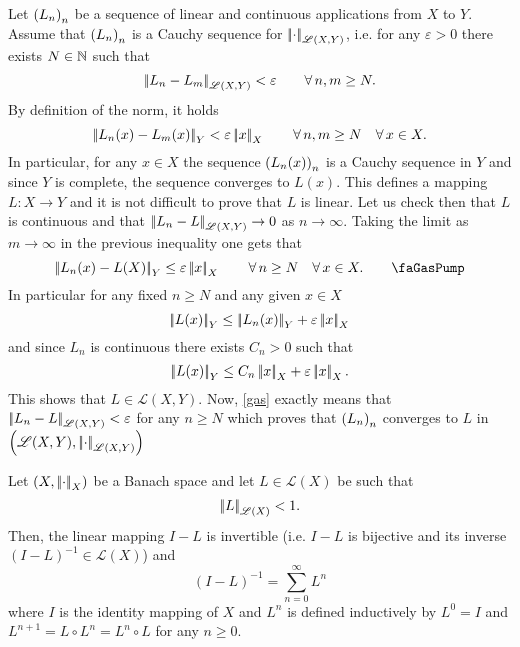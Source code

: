 \documentclass{article}
\begin{document}
\begin{fancyproof}
	Let ${\left({L}_{n}\right)}_{n}$ be a sequence of linear and continuous applications from $X$ to $Y$. Assume that ${\left({L}_{n}\right)}_{n}$ is a Cauchy sequence for $\left|\negthinspace\left|\cdot\right|\negthinspace\right|_{\mathscr{L}(X,Y)}$, i.e. for any $\varepsilon>0$ there exists $N\in\mathbb{N}$ such that
	\begin{equation*}
		\left|\negthinspace\left|L_{n}-L_{m}\right|\negthinspace\right|_{\mathscr{L}(X,Y)}<\varepsilon\qquad \forall\, n,m\geq N.
	\end{equation*}
	By definition of the norm, it holds 
	\begin{equation*}
		\left|\negthinspace\left|L_{n}(x)-L_{m}(x)\right|\negthinspace\right|_{Y}<\varepsilon\left|\negthinspace\left|x\right|\negthinspace\right|_{X}\qquad\forall\, n,m\geq  N\quad\forall\, x\in X.
	\end{equation*}
	In particular, for any $x\in X$ the sequence ${\left(L_{n}(x)\right)}_{n}$ is a Cauchy sequence in $Y$ and since $Y$ is complete, the sequence converges to $L(x)$. This defines a mapping $L:X\to Y$ and it is not difficult to prove that $L$ is linear. Let us check then that $L$ is continuous and that $\left|\negthinspace\left|L_{n}-L\right|\negthinspace\right|_{\mathscr{L}(X,Y)}\to0$ as $n\to\infty$. Taking the limit as $m\to\infty$ in the previous inequality one gets that 
	\begin{equation*}
		\norm{L_{n}(x)-L(X)}_{Y}\leq\varepsilon\norm{x}_{X}\qquad\every n\geq N\quad\every x\in X.\tag*{\faGasPump}\label{gas}
	\end{equation*}
	In particular for any fixed $n\geq N$ and any given $x\in X$
	\begin{equation*}
		\left|\negthinspace\left|L(x)\right|\negthinspace\right|_{Y}\leq\left|\negthinspace\left|L_{n}(x)\right|\negthinspace\right|_{Y}+\varepsilon\left|\negthinspace\left|x\right|\negthinspace\right|_{X}
	\end{equation*}
	and since $L_{n}$ is continuous there exists $C_{n}>0$ such that
	\begin{equation*}
		\left|\negthinspace\left|L(x)\right|\negthinspace\right|_{Y}\leq C_{n}\left|\negthinspace\left|x\right|\negthinspace\right|_{X}+\varepsilon\left|\negthinspace\left|x\right|\negthinspace\right|_{X}.
	\end{equation*}
	This shows that $L\in\mathscr{L}(X,Y)$. Now, \ref{gas} exactly means that $\left|\negthinspace\left|L_{n}-L\right|\negthinspace\right|_{\mathscr{L}(X,Y)}<\varepsilon$ for any $n\geq N$ which proves that ${\left({L}_{n}\right)}_{n}$ converges to $L$ in $\left(\mathscr{L}(X,Y),\left|\negthinspace\left|\cdot\right|\negthinspace\right|_{\mathscr{L}(X,Y)}\right)$
\end{fancyproof}
\begin{corollary}
	Let $\left(X,\left|\negthinspace\left|\cdot\right|\negthinspace\right|_{X}\right)$ be a Banach space and let $L\in\mathscr{L}(X)$ be such that
	\begin{equation*}
		\left|\negthinspace\left|L\right|\negthinspace\right|_{\mathscr{L}(X)}<1.
	\end{equation*}
	Then, the linear mapping $I-L$ is invertible (i.e. $I-L$ is bijective and its inverse $(I-L)^{-1}\in\mathscr{L}(X)$) and
	\begin{equation*}
		(I-L)^{-1}=\sum_{n=0}^{\infty}L^{n}
	\end{equation*}
	where $I$ is the identity mapping of $X$ and $L^{n}$ is defined inductively by $L^{0}=I$ and $L^{n+1}=L\circ L^{n}=L^{n}\circ L$ for any $n\geq 0$.
\end{corollary}
\end{document}
